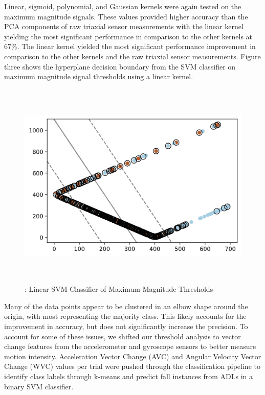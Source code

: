 \documentclass{llncs}
\begin{document}
	Linear, sigmoid, polynomial, and Gaussian kernels were again tested on the maximum magnitude signals. These values provided higher accuracy than the PCA components of raw triaxial sensor measurements with the linear kernel yielding the most significant performance in comparison to the other kernels at 67\%. The linear kernel yielded the most significant performance improvement in comparison to the other kernels and the raw triaxial sensor measurements. Figure three shows the hyperplane decision boundary from the SVM classifier on maximum magnitude signal thresholds using a linear kernel.
	
\begin{figure}
	\centering
	\includegraphics[width=12cm, height=10cm]{images/Classification/linear_classifier_boundary.png} 
	\caption{: Linear SVM Classifier of Maximum Magnitude Thresholds}
	\label{Figure 3: Linear Kernel SVM with Magnitude Thresholds Hyperplane}
\end{figure} 	

	Many of the data points appear to be clustered in an elbow shape around the origin, with most representing the majority class. This likely accounts for the improvement in accuracy, but does not significantly increase the precision. To account for some of these issues, we shifted our threshold analysis to vector change features from the accelerometer and gyroscope sensors to better measure motion intensity. Acceleration Vector Change (AVC) and Angular Velocity Vector Change (WVC) values per trial were pushed through the classification pipeline to identify class labels through k-means and predict fall instances from ADLs in a binary SVM classifier.
	
\end{document}
